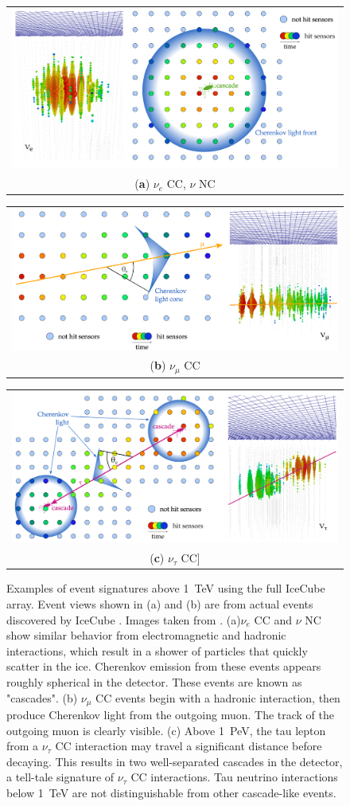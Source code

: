 \begin{figure}[h]
\centering
\begin{tabular}[b]{c}
  \includegraphics[width=0.3\linewidth]{icecube_he_nue.png} \\
  \small (\textbf{\color{ctcolormain}a}) $\nu_e$ CC, $\nu$ NC
\end{tabular} \hspace{2pt}
\begin{tabular}[b]{c}
  \includegraphics[width=0.3\linewidth]{icecube_he_numu.png} \\
  \small (\textbf{\color{ctcolormain}b}) $\nu_\mu$ CC
\end{tabular}
\begin{tabular}[b]{c}
  \includegraphics[width=0.3\linewidth]{icecube_he_nutau.png} \\
  \small (\textbf{\color{ctcolormain}c}) $\nu_\tau$ CC]
\end{tabular}
\caption[Event signatures above 1~TeV in IceCube]{Examples of event signatures above 1~TeV using the full IceCube array. Event views shown in (a) and (b) are from actual events discovered by IceCube \cite{IceCube-AstroNu}. Images taken from \cite{Thesis-Euler}. (a)$\nu_e$ CC and $\nu$ NC show similar behavior from electromagnetic and hadronic interactions, which result in a shower of particles that quickly scatter in the ice. Cherenkov emission from these events appears roughly spherical in the detector. These events are known as "cascades". (b) $\nu_\mu$ CC events begin with a hadronic interaction, then produce Cherenkov light from the outgoing muon. The track of the outgoing muon is clearly visible. (c) Above 1~PeV, the tau lepton from a $\nu_\tau$ CC interaction may travel a significant distance before decaying. This results in two well-separated cascades in the detector, a tell-tale signature of $\nu_\tau$ CC interactions. Tau neutrino interactions below 1~TeV are not distinguishable from  other cascade-like events.}
\label{fig:icecube_he_events}
\end{figure}

